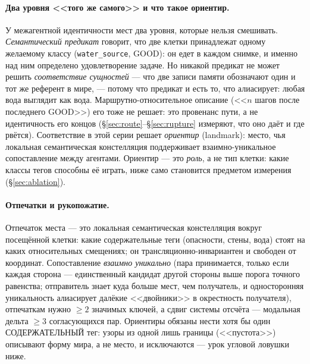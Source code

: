 \documentclass{article}
\begin{document}
\paragraph{Два уровня <<того же самого>> и что такое ориентир.}
У межагентной идентичности мест два уровня, которые нельзя смешивать.
\emph{Семантический предикат} говорит, что две клетки принадлежат
одному желаемому классу (\texttt{water\_source}, GOOD): он едет в
каждом снимке, и именно над ним определено удовлетворение задаче. Но
никакой предикат не может решить \emph{соответствие сущностей} --- что
две записи памяти обозначают один и тот же референт в мире, --- потому
что предикат и есть то, что алиасирует: любая вода выглядит как вода.
Маршрутно-относительное описание (<<$n$ шагов после последнего
GOOD>>) его тоже не решает: это провенанс пути, а не идентичность его
концов (\S\ref{sec:route}--\S\ref{sec:rupture} измеряют, что оно даёт
и где рвётся). Соответствие в этой серии решает \emph{ориентир}
(landmark): место, чья локальная семантическая констелляция
поддерживает взаимно-уникальное сопоставление между агентами. Ориентир
--- это \emph{роль}, а не тип клетки: какие классы тегов способны её
играть, ниже само становится предметом измерения
(\S\ref{sec:ablation}).

\paragraph{Отпечатки и рукопожатие.} Отпечаток места --- это локальная
семантическая констелляция вокруг посещённой клетки: какие
содержательные теги (опасности, стены, вода) стоят на каких
относительных смещениях; он трансляционно-инвариантен и свободен от
координат. Сопоставление \emph{взаимно уникально} (пара принимается,
только если каждая сторона --- единственный кандидат другой стороны
выше порога точного равенства; отправитель знает куда больше мест, чем
получатель, и односторонняя уникальность алиасирует далёкие
<<двойники>> в окрестность получателя), отпечаткам нужно $\ge 2$
значимых ключей, а сдвиг системы отсчёта --- модальная дельта $\ge 3$
согласующихся пар. Ориентиры обязаны нести хотя бы один
СОДЕРЖАТЕЛЬНЫЙ тег: узоры из одной лишь границы (<<пустота>>)
описывают форму мира, а не место, и исключаются --- урок угловой
ловушки ниже.
\end{document}
